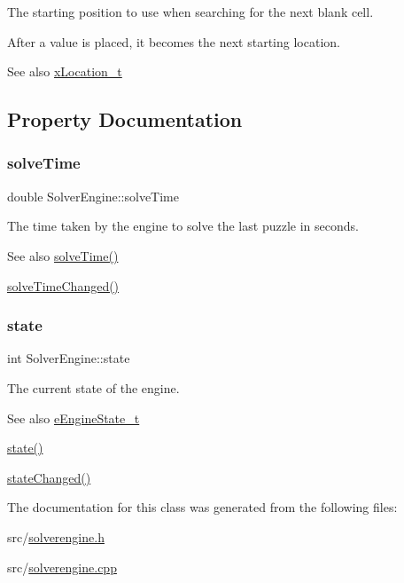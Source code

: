 The starting position to use when searching for the next blank cell. 

After a value is placed, it becomes the next starting location. \begin{DoxySeeAlso}{See also}
\mbox{\hyperlink{struct_solver_engine_1_1x_location__t}{x\+Location\+\_\+t}} 
\end{DoxySeeAlso}


\subsection{Property Documentation}
\mbox{\label{class_solver_engine_aac9c7fba1a049fe08bcfd341700840fb}} 
\subsubsection{\texorpdfstring{solve\+Time}{solveTime}}
{\footnotesize\ttfamily double Solver\+Engine\+::solve\+Time\hspace{0.3cm}{\ttfamily [read]}}



The time taken by the engine to solve the last puzzle in seconds. 

\begin{DoxySeeAlso}{See also}
\mbox{\hyperlink{class_solver_engine_aac9c7fba1a049fe08bcfd341700840fb}{solve\+Time()}} 

\mbox{\hyperlink{class_solver_engine_a66c3ab757c4e8aa50484f992f2b1ba7e}{solve\+Time\+Changed()}} 
\end{DoxySeeAlso}
\mbox{\label{class_solver_engine_a6ac564f91cd5c523ece2c561a37b8263}} 
\subsubsection{\texorpdfstring{state}{state}}
{\footnotesize\ttfamily int Solver\+Engine\+::state\hspace{0.3cm}{\ttfamily [read]}}



The current state of the engine. 

\begin{DoxySeeAlso}{See also}
\mbox{\hyperlink{class_solver_engine_acd25f3521e492d4aa924f922396bf02c}{e\+Engine\+State\+\_\+t}} 

\mbox{\hyperlink{class_solver_engine_a6ac564f91cd5c523ece2c561a37b8263}{state()}} 

\mbox{\hyperlink{class_solver_engine_a73fd20671c169def4c85c53a2102e920}{state\+Changed()}} 
\end{DoxySeeAlso}


The documentation for this class was generated from the following files\+:\begin{DoxyCompactItemize}
\item 
src/\mbox{\hyperlink{solverengine_8h}{solverengine.\+h}}\item 
src/\mbox{\hyperlink{solverengine_8cpp}{solverengine.\+cpp}}\end{DoxyCompactItemize}
